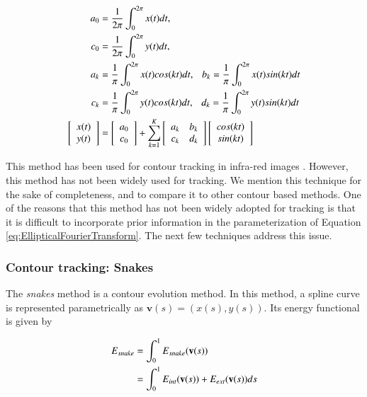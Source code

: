 \documentclass[12pt,letterpaper,doublespaced,ETD,proposal]{gt-ece-thesis}
\begin{document}
\begin{Body}
\begin{align}
\centering
	\label{eq:EllipticalFourierTransform}
	a_0&=\frac{1}{2\pi}\int_0^{2 \pi}x(t)dt,       \notag\\ 
	c_0&=\frac{1}{2\pi}\int_0^{2 \pi}y(t)dt,       \notag\\ 
	a_k&=\frac{1}{\pi}\int_0^{2 \pi}x(t)cos(kt)dt,   \ \ \   b_k=\frac{1}{\pi}\int_0^{2 \pi}x(t)sin(kt)dt    \notag\\
	c_k&=\frac{1}{\pi}\int_0^{2 \pi}y(t)cos(kt)dt,    \ \ \  d_k=\frac{1}{\pi}\int_0^{2 \pi}y(t)sin(kt)dt    \notag\\
	\left[ \begin{array}{ccc}x(t) \\y(t) \end{array}\right] &=\left[ \begin{array}{ccc}a_0\\c_0 \end{array}\right] + \sum_{k=1}^K \left[ \begin{array}{ccc}a_k & b_k\\c_k & d_k \end{array}\right]\left[ \begin{array}{ccc}cos(kt)\\sin(kt) \end{array}\right]
\end{align}

This method has been used for contour tracking in infra-red images \cite{2010_CNF_VehicleContour_Aslam}.  However, this method has not been widely used for tracking.  We mention this technique for the sake of completeness, and to compare it to other contour based methods.  One of the reasons that this method has not been widely adopted for tracking is that it is difficult to incorporate prior information in the parameterization of Equation \ref{eq:EllipticalFourierTransform}.  The next few techniques address this issue.

\subsubsection{Contour tracking: Snakes}
The \emph{snakes} method \cite{1988_JNL_Snakes_Kass} is a contour evolution method.  In this method, a spline curve is represented parametrically as $\mathbf{v}(s) = (x(s), y(s))$.  Its energy functional is given by

\begin{align}
E_{snake} &= \int_0^1 E_{snake}(\mathbf{v}(s)) \notag\\
&=\int_0^1 E_{int}(\mathbf{v}(s)) + E_{ext}(\mathbf{v}(s)) ds
\label{Eq:Snakes}
\end{align}


\end{Body}
\end{document}
